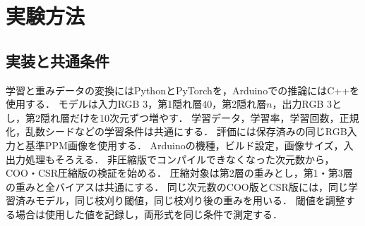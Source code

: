 \documentclass[a4paper,11pt]{article}
\begin{document}


\section{実験方法}
\subsection{実装と共通条件}
学習と重みデータの変換にはPythonとPyTorchを，Arduinoでの推論にはC++を使用する．
モデルは入力RGB 3，第1隠れ層40，第2隠れ層$n$，出力RGB 3とし，第2隠れ層だけを10次元ずつ増やす．
学習データ，学習率，学習回数，正規化，乱数シードなどの学習条件は共通にする．
評価には保存済みの同じRGB入力と基準PPM画像を使用する．
Arduinoの機種，ビルド設定，画像サイズ，入出力処理もそろえる．
非圧縮版でコンパイルできなくなった次元数から，COO・CSR圧縮版の検証を始める．
圧縮対象は第2層の重みとし，第1・第3層の重みと全バイアスは共通にする．
同じ次元数のCOO版とCSR版には，同じ学習済みモデル，同じ枝刈り閾値，同じ枝刈り後の重みを用いる．
閾値を調整する場合は使用した値を記録し，両形式を同じ条件で測定する．
\end{document}
